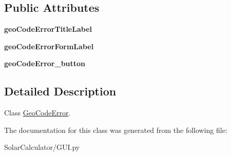 \subsection*{Public Attributes}
\begin{DoxyCompactItemize}
\item 
\hypertarget{class_solar_calculator_1_1_g_u_i_1_1_geo_code_error_a82df156650c93a13efa13242d2792876}{{\bfseries geo\-Code\-Error\-Title\-Label}}\label{class_solar_calculator_1_1_g_u_i_1_1_geo_code_error_a82df156650c93a13efa13242d2792876}

\item 
\hypertarget{class_solar_calculator_1_1_g_u_i_1_1_geo_code_error_ab5b987c78e3296e941e05542e4342bfe}{{\bfseries geo\-Code\-Error\-Form\-Label}}\label{class_solar_calculator_1_1_g_u_i_1_1_geo_code_error_ab5b987c78e3296e941e05542e4342bfe}

\item 
\hypertarget{class_solar_calculator_1_1_g_u_i_1_1_geo_code_error_a0391c67fbd797c2f1aed7854d0ae81d0}{{\bfseries geo\-Code\-Error\-\_\-button}}\label{class_solar_calculator_1_1_g_u_i_1_1_geo_code_error_a0391c67fbd797c2f1aed7854d0ae81d0}

\end{DoxyCompactItemize}


\subsection{Detailed Description}
Class \hyperlink{class_solar_calculator_1_1_g_u_i_1_1_geo_code_error}{Geo\-Code\-Error}. 

The documentation for this class was generated from the following file\-:\begin{DoxyCompactItemize}
\item 
Solar\-Calculator/G\-U\-I.\-py\end{DoxyCompactItemize}

